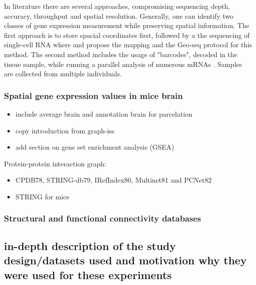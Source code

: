 \documentclass[]{article}
\renewcommand{\cite}{\citep}
\begin{document}
In literature there are several approaches, compromising sequencing depth, accuracy, throughput and spatial resolution. Generally, one can identify two classes of gene expression measurement while preserving spatial information. The first approach is to store spacial coordinates first, followed by a the sequencing of single-cell RNA where \citet{achim2015high} and \citet{chen2017spatial} propose the mapping and the Geo-seq protocol for this method. The second method includes the usage of "barcodes", decoded in the tissue sample, while running a parallel analysis of numerous mRNAs \cite{ke2013situ, moffitt2016high}. Samples are collected from multiple individuals.


\subsubsection{Spatial gene expression values in mice brain}
\begin{itemize}
	\item include average brain and annotation brain for parcelation
	\item copy introduction from graph-iss
	\item add section on gene set enrichment analysis (GSEA)
\end{itemize}

Protein-protein interaction graph:
\begin{itemize}
	\item CPDB78, STRING-db79, IRefIndex80, Multinet81 and PCNet82
	\item STRING\cite{STRINGv10} for mice
\end{itemize}

\subsubsection{Structural and functional connectivity databases}


\subsection*{in-depth description of the study design/datasets used and motivation why they were used for these experiments}
\end{document}

